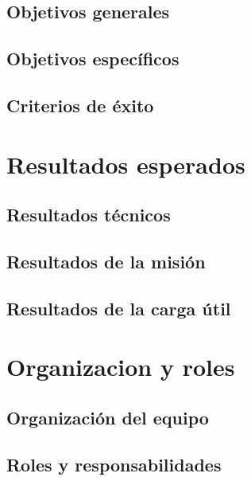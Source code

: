 \documentclass[letterpaper]{article} %
\begin{document}
    \subsection{Objetivos generales}

    \subsection{Objetivos específicos}
    
    \subsection{Criterios de éxito}

\section{Resultados esperados}

    \subsection{Resultados técnicos}

    \subsection{Resultados de la misión}

    \subsection{Resultados de la carga útil}

\section{Organizacion y roles}

    \subsection{Organización del equipo}

    \subsection{Roles y responsabilidades}
\end{document}
